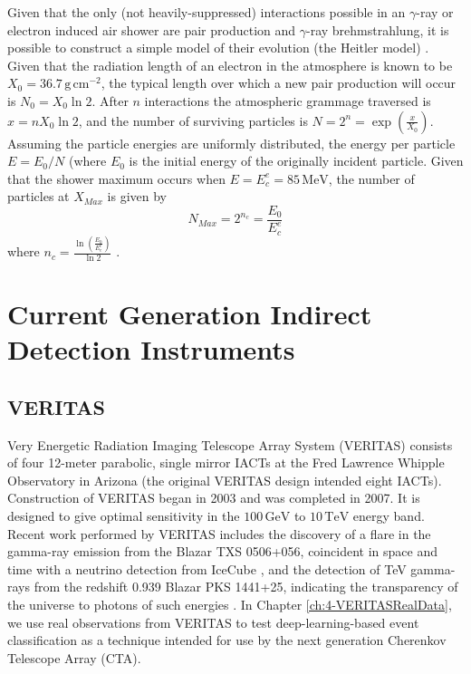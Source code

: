 Given that the only (not heavily-suppressed) interactions possible in an $\gamma$-ray or electron induced air shower are pair production and $\gamma$-ray brehmstrahlung, it is possible to construct a simple model of their evolution (the Heitler model) \cite{heitler}. Given that the radiation length of an electron in the atmosphere is known to be $X_0=\mathrm{36.7\,g\,cm^{-2}}$, the typical length over which a new pair production will occur is $N_0=X_0 \ln 2$. After $n$ interactions the atmospheric grammage traversed is $x=nX_0 \ln 2$, and the number of surviving particles is $N=2^n=\exp \left( \frac{x}{X_0}\right)$. Assuming the particle energies are uniformly distributed, the energy per particle $E=E_0/N$ (where $E_0$ is the initial energy of the originally incident particle. Given that the shower maximum occurs when $E=E_c^e=\mathrm{85\,MeV}$, the number of particles at $X_{Max}$ is given by 
\begin{equation}
    N_{Max}=2^{n_c}=\frac{E_0}{E_c^e}
\end{equation}
where $n_c=\frac{\ln (\frac{E_0}{E_e^c})}{\ln 2}$ \cite{heitler}.

\section{Current Generation Indirect Detection Instruments}
\subsection{VERITAS}
Very Energetic Radiation Imaging Telescope Array System (VERITAS) consists of four 12-meter parabolic, single mirror IACTs at the Fred Lawrence Whipple Observatory in Arizona (the original VERITAS design intended eight IACTs). Construction of VERITAS began in 2003 and was completed in 2007. It is designed to give optimal sensitivity in the $\mathrm{100\,GeV}$ to $\mathrm{10\,TeV}$ energy band. Recent work performed by VERITAS includes the discovery of a flare in the gamma-ray emission from the Blazar TXS 0506+056, coincident in space and time with a neutrino detection from IceCube \cite{TXS}, and the detection of TeV gamma-rays from the redshift 0.939 Blazar PKS 1441+25, indicating the transparency of the universe to photons of such energies \cite{escape}. In Chapter \ref{ch:4-VERITASRealData}, we use real observations from VERITAS to test deep-learning-based event classification as a technique intended for use by the next generation Cherenkov Telescope Array (CTA).

